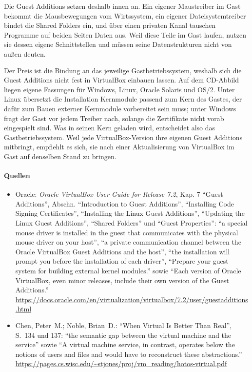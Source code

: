 Die Guest Additions setzen deshalb innen an. Ein eigener Maustreiber im Gast bekommt die Mausbewegungen vom Wirtssystem, ein eigener Dateisystemtreiber bindet die Shared Folders ein, und über einen privaten Kanal tauschen Programme auf beiden Seiten Daten aus. Weil diese Teile im Gast laufen, nutzen sie dessen eigene Schnittstellen und müssen seine Datenstrukturen nicht von außen deuten.

Der Preis ist die Bindung an das jeweilige Gastbetriebssystem, weshalb sich die Guest Additions nicht fest in VirtualBox einbauen lassen. Auf dem CD-Abbild liegen eigene Fassungen für Windows, Linux, Oracle Solaris und OS/2. Unter Linux übersetzt die Installation Kernmodule passend zum Kern des Gastes, der dafür zum Bauen externer Kernmodule vorbereitet sein muss; unter Windows fragt der Gast vor jedem Treiber nach, solange die Zertifikate nicht vorab eingespielt sind. Was in seinen Kern geladen wird, entscheidet also das Gastbetriebssystem. Weil jede VirtualBox-Version ihre eigenen Guest Additions mitbringt, empfiehlt es sich, sie nach einer Aktualisierung von VirtualBox im Gast auf denselben Stand zu bringen.

\paragraph{Quellen}
\begin{itemize}[quellen]
  \item Oracle: \emph{Oracle VirtualBox User Guide for Release 7.2}, Kap. 7 \enquote{Guest Additions}, Abschn. \enquote{Introduction to Guest Additions}, \enquote{Installing Code Signing Certificates}, \enquote{Installing the Linux Guest Additions}, \enquote{Updating the Linux Guest Additions}, \enquote{Shared Folders} und \enquote{Guest Properties}: \enquote{a special mouse driver is installed in the guest that communicates with the physical mouse driver on your host}, \enquote{a private communication channel between the Oracle VirtualBox Guest Additions and the host}, \enquote{the installation will prompt you before the installation of each driver}, \enquote{Prepare your guest system for building external kernel modules.} sowie \enquote{Each version of Oracle VirtualBox, even minor releases, include their own version of the Guest Additions.} \url{https://docs.oracle.com/en/virtualization/virtualbox/7.2/user/guestadditions.html}
  \item Chen, Peter~M.; Noble, Brian~D.: \enquote{When Virtual Is Better Than Real}, S.~134 und 137: \enquote{the semantic gap between the virtual machine and the service} sowie \enquote{A virtual machine service, in contrast, operates below the notions of users and files and would have to reconstruct these abstractions.} \url{https://pages.cs.wisc.edu/~stjones/proj/vm_reading/hotos-virtual.pdf}
\end{itemize}

